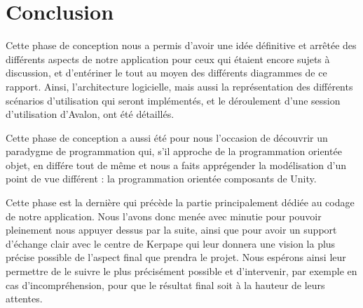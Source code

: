 \section{Conclusion}

Cette phase de conception nous a permis d'avoir une idée définitive et arrêtée des différents aspects de notre application pour ceux qui étaient encore sujets à discussion, et d'entériner le tout au moyen des différents diagrammes de ce rapport. Ainsi, l'architecture logicielle, mais aussi la représentation des différents scénarios d'utilisation qui seront implémentés, et le déroulement d'une session d'utilisation d'Avalon, ont été détaillés. \newline

Cette phase de conception a aussi été pour nous l'occasion de découvrir un paradygme de programmation qui, s'il approche de la programmation orientée objet, en différe tout de même et nous a faits apprégender la modélisation d'un point de vue différent : la programmation orientée composants de Unity.\newline

Cette phase est la dernière qui précède la partie principalement dédiée au codage de notre application. Nous l'avons donc menée avec minutie pour pouvoir pleinement nous appuyer dessus par la suite, ainsi que pour avoir un support d'échange clair avec le centre de Kerpape qui leur donnera une vision la plus précise possible de l'aspect final que prendra le projet. Nous espérons ainsi leur permettre de le suivre le plus précisément possible et d'intervenir, par exemple en cas d'incompréhension, pour que le résultat final soit à la hauteur de leurs attentes.